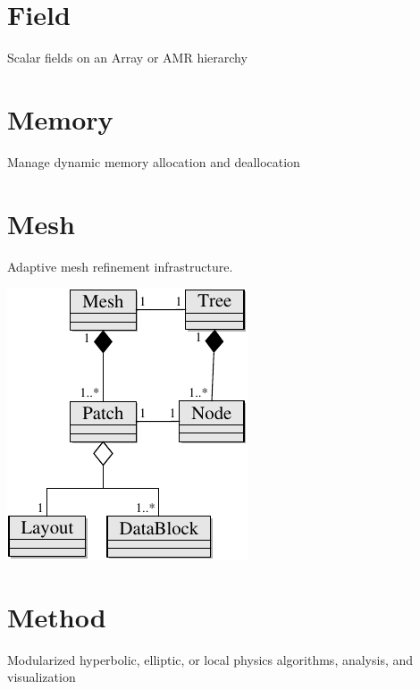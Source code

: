 \documentclass{book}
\begin{document}
\section{Field}

Scalar fields on an Array or AMR hierarchy

\section{Memory}

Manage dynamic memory allocation and deallocation

\section{Mesh}

Adaptive mesh refinement infrastructure.

\centerline{\includegraphics{uml/amr.pdf}}

\section{Method}

Modularized hyperbolic, elliptic, or local physics algorithms,
analysis, and visualization
\end{document}
